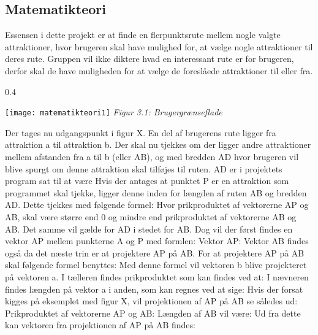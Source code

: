 \subsection{Matematikteori}
Essensen i dette projekt er at finde en flerpunktsrute mellem nogle valgte attraktioner, hvor brugeren skal have mulighed for, at vælge nogle attraktioner til deres rute. Gruppen vil ikke diktere hvad en interessant rute er for brugeren, derfor skal de have muligheden for at vælge de foreslåede attraktioner til eller fra.

\begin{wrapfigure}{}{0.4\textwidth}
  \vspace{-20pt}
  \begin{center}
    \texttt{[image: matematikteori1]} \newline
    \textit{Figur 3.1: Brugergrænseflade}\newline
  \end{center}
  \vspace{-20pt}
\end{wrapfigure}
 
Der tages nu udgangspunkt i figur X. En del af brugerens rute ligger fra attraktion a til attraktion b. Der skal nu tjekkes om der ligger andre attraktioner mellem afstanden fra a til b (eller AB), og med bredden AD hvor brugeren vil blive spurgt om denne attraktion skal tilføjes til ruten. AD er i projektets program sat til at være %
Hvis der antages at punktet P er en attraktion som programmet skal tjekke, ligger denne inden for længden af ruten AB og bredden AD. Dette tjekkes med følgende formel:
Hvor prikproduktet af vektorerne AP og AB, skal være større end 0 og mindre end prikproduktet af vektorerne AB og AB. Det samme vil gælde for AD i stedet for AB.
Dog vil der først findes en vektor AP mellem punkterne A og P med formlen:  %
Vektor AP: %
Vektor AB findes også da det næste trin er at projektere AP på AB. %
For at projektere AP på AB skal følgende formel benyttes: %
Med denne formel vil vektoren b blive projekteret på vektoren a. I tælleren findes prikproduktet som kan findes ved at: %
I nævneren findes længden på vektor a i anden, som kan regnes ved at sige: %
Hvis der forsat kigges på eksemplet med figur X, vil projektionen af AP på AB se således ud:
Prikproduktet af vektorerne AP og AB: %
Længden af AB vil være: %
Ud fra dette kan vektoren fra projektionen af AP på AB findes: %


